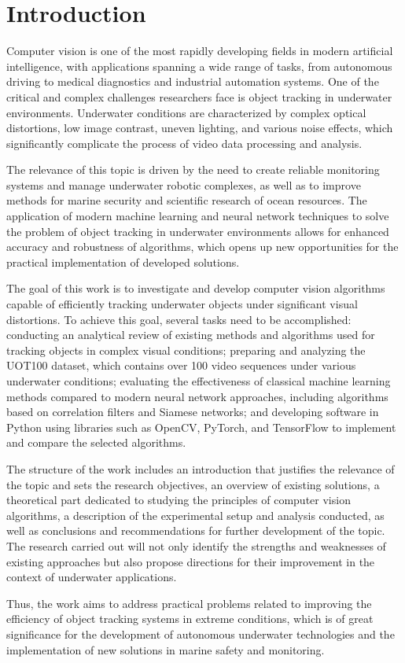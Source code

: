 \chapter*{Introduction}
\label{ch:intro}

Computer vision is one of the most rapidly developing fields in modern artificial intelligence, with applications spanning a wide range of tasks, from autonomous driving to medical diagnostics and industrial automation systems. One of the critical and complex challenges researchers face is object tracking in underwater environments. Underwater conditions are characterized by complex optical distortions, low image contrast, uneven lighting, and various noise effects, which significantly complicate the process of video data processing and analysis.

The relevance of this topic is driven by the need to create reliable monitoring systems and manage underwater robotic complexes, as well as to improve methods for marine security and scientific research of ocean resources. The application of modern machine learning and neural network techniques to solve the problem of object tracking in underwater environments allows for enhanced accuracy and robustness of algorithms, which opens up new opportunities for the practical implementation of developed solutions.

The goal of this work is to investigate and develop computer vision algorithms capable of efficiently tracking underwater objects under significant visual distortions. To achieve this goal, several tasks need to be accomplished: conducting an analytical review of existing methods and algorithms used for tracking objects in complex visual conditions; preparing and analyzing the UOT100 dataset, which contains over 100 video sequences under various underwater conditions; evaluating the effectiveness of classical machine learning methods compared to modern neural network approaches, including algorithms based on correlation filters and Siamese networks; and developing software in Python using libraries such as OpenCV, PyTorch, and TensorFlow to implement and compare the selected algorithms.

The structure of the work includes an introduction that justifies the relevance of the topic and sets the research objectives, an overview of existing solutions, a theoretical part dedicated to studying the principles of computer vision algorithms, a description of the experimental setup and analysis conducted, as well as conclusions and recommendations for further development of the topic. The research carried out will not only identify the strengths and weaknesses of existing approaches but also propose directions for their improvement in the context of underwater applications. 

Thus, the work aims to address practical problems related to improving the efficiency of object tracking systems in extreme conditions, which is of great significance for the development of autonomous underwater technologies and the implementation of new solutions in marine safety and monitoring.

\endinput